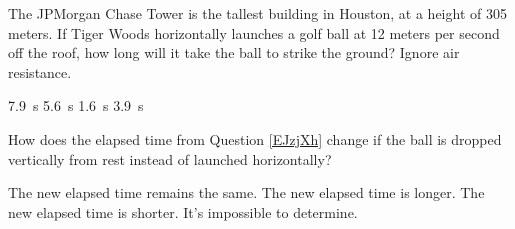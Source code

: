 \documentclass[dvipsnames]{exam}
\begin{document}
\begin{questions}
\clearpage

\question \label{EJzjXh}
The JPMorgan Chase Tower is the tallest building in Houston, at a height of 305 meters. If Tiger Woods horizontally launches a golf ball at 12 meters per second off the roof, how long will it take the ball to strike the ground? Ignore air resistance.

\begin{minipage}{6cm}
    \centering
    \begin{randomizechoices}
        \correctchoice \SI{7.9}{s}
        \choice \SI{5.6}{s}
        \choice \SI{1.6}{s}
        \choice \SI{3.9}{s}
    \end{randomizechoices}
\end{minipage}%
\begin{minipage}{6cm}
    \centering
    \begin{center}
    \end{center}
\end{minipage}

\question
How does the elapsed time from Question \ref{EJzjXh} change if the ball is dropped vertically from rest instead of launched horizontally?

\begin{randomizechoices}[keeplast]
    \correctchoice The new elapsed time remains the same.
    \choice The new elapsed time is longer.
    \choice The new elapsed time is shorter.
    \choice It's impossible to determine.
\end{randomizechoices}


\end{questions}
\end{document}
